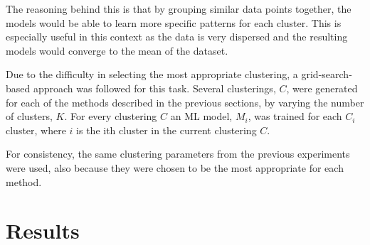 The reasoning behind this is that by grouping similar data points together, the models would be able to learn more specific patterns for each cluster. This is especially useful in this context as the data is very dispersed and the resulting models would converge to the mean of the dataset. %

Due to the difficulty in selecting the most appropriate clustering, a grid-search-based approach was followed for this task. Several clusterings, $C$, were generated for each of the methods described in the previous sections, by varying the number of clusters, $K$. For every clustering $C$ an ML model, $M_i$, was trained for each $C_{i}$ cluster, where $i$ is the ith cluster in the current clustering $C$.

For consistency, the same clustering parameters from the previous experiments were used, also because they were chosen to be the most appropriate for each method. 


\section{Results}\label{sec:clustering_results}
